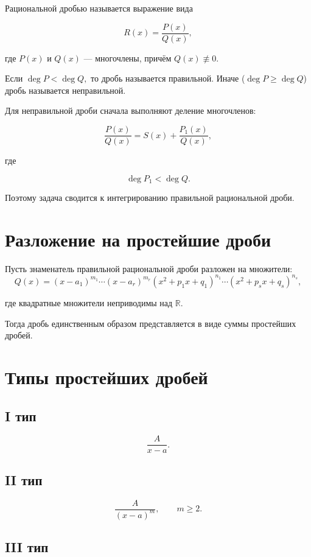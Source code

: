 \documentclass[14pt]{extreport}
\begin{document}
    \begin{definition}
    Рациональной дробью называется выражение вида

    \[
    R(x)=\frac{P(x)}{Q(x)},
    \]

    где $P(x)$ и $Q(x)$ --- многочлены, причём
    $Q(x)\not\equiv0$.
    \end{definition}

    Если $\deg P < \deg Q,$
    то дробь называется правильной.
    Иначе ($\deg P \ge \deg Q$)
    дробь называется неправильной.

    Для неправильной дроби сначала выполняют деление многочленов:

    \[
    \frac{P(x)}{Q(x)}
    =
    S(x)+\frac{P_1(x)}{Q(x)},
    \]

    где

    \[
    \deg P_1 < \deg Q.
    \]

    Поэтому задача сводится к интегрированию правильной рациональной дроби.

    \section{Разложение на простейшие дроби}

Пусть знаменатель правильной рациональной дроби разложен на множители:
\[
Q(x)=
(x-a_1)^{m_1}
\cdots
(x-a_r)^{m_r}
(x^2+p_1x+q_1)^{n_1}
\cdots
(x^2+p_sx+q_s)^{n_s},
\]

где квадратные множители неприводимы над $\mathbb R$.

Тогда дробь единственным образом представляется в виде суммы простейших дробей.


\section{Типы простейших дробей}

\subsection*{I тип}

\[
\frac{A}{x-a}.
\]

\subsection*{II тип}

\[
\frac{A}{(x-a)^m},
\qquad
m\ge2.
\]

\subsection*{III тип}
\end{document}
